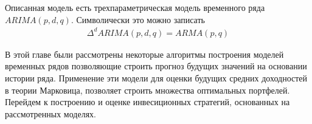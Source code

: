 Описанная модель есть трехпараметрическая модель временного ряда $ARIMA(p, d, q)$. Символически это можно записать
\begin{align}
	\Delta^d ARIMA(p, d, q) = ARMA(p, q)
\end{align}

В этой главе были рассмотрены некоторые алгоритмы построения моделей временных рядов позволяющие строить прогноз будущих значений на основании
истории ряда. Применение эти модели для оценки будущих средних доходностей в теории Марковица, позволяет строить множества оптимальных портфелей.
Перейдем к построению и оценке инвесиционных стратегий, основанных на рассмотренных моделях.